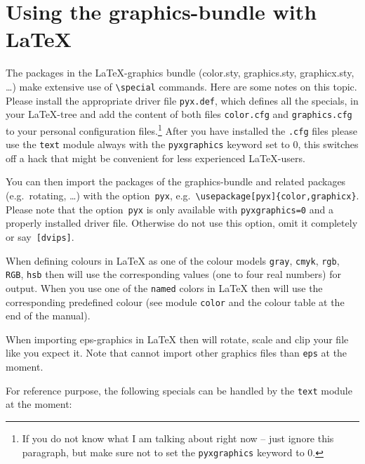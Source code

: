 \section[Using the graphics-bundle with LaTeX]{Using the graphics-bundle with \LaTeX}

The packages in the \LaTeX-graphics bundle (color.sty, graphics.sty,
graphicx.sty, \ldots) make extensive use of \verb|\special| commands.
Here are some notes on this topic. Please install the appropriate
driver file \verb|pyx.def|, which defines all the specials, in your
\LaTeX-tree and add the content of both files \verb|color.cfg| and
\verb|graphics.cfg| to your personal configuration files.\footnote{If
you do not know what I am talking about right now -- just ignore this
paragraph, but make sure not to set the \texttt{pyxgraphics} keyword
to 0.} After you have installed the \verb|.cfg| files please use the
\verb|text| module always with the \verb|pyxgraphics| keyword set to
0, this switches off a hack that might be convenient for less
experienced \LaTeX-users.

You can then import the packages of the graphics-bundle and related
packages (e.g.~rotating, \ldots) with the option~\verb|pyx|,
e.g.~\verb|\usepackage[pyx]{color,graphicx}|. Please note that the
option~\verb|pyx| is only available with \verb|pyxgraphics=0| and a
properly installed driver file. Otherwise do not use this option, omit
it completely or say~\verb|[dvips]|.

When defining colours in \LaTeX{} as one of the colour models
\verb|gray|, \verb|cmyk|, \verb|rgb|, \verb|RGB|, \verb|hsb| then
\PyX{} will use the corresponding values (one to four real numbers)
for output. When you use one of the \verb|named| colors in \LaTeX{}
then \PyX{} will use the corresponding predefined colour (see module
\verb|color| and the colour table at the end of the manual).

When importing eps-graphics in \LaTeX{} then \PyX{} will rotate, scale
and clip your file like you expect it. Note that \PyX{} cannot import
other graphics files than \verb|eps| at the moment.

For reference purpose, the following specials can be handled by the
\verb|text| module at the moment:\medskip

